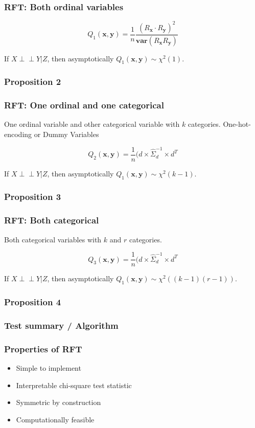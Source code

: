 \documentclass{beamer}
\def\ci{\perp\!\!\!\!\!\perp}
\begin{document}
\begin{frame}
	\frametitle{RFT: Both ordinal variables}
	$$ Q_1(\bm{x}, \bm{y}) = \frac{1}{n} \frac{(R_{\bm{x}} \cdot R_{\bm{y}})^2}{\bm{var}(R_{\bm{x}} R_{\bm{y}})} $$

	If $ X \ci Y | Z $, then asymptotically $ Q_1(\bm{x}, \bm{y}) \sim \chi^2(1) $.
\end{frame}

\begin{frame}
	\frametitle{Proposition 2}
\end{frame}

\begin{frame}
	\frametitle{RFT: One ordinal and one categorical}
	One ordinal variable and other categorical variable with $ k $ categories.
	One-hot-encoding or Dummy Variables


	$$ Q_2(\bm{x}, \bm{y}) = \frac{1}{n} (d \times \hat{\Sigma}_d^{-1} \times d^T $$

	If $ X \ci Y | Z $, then asymptotically $ Q_1(\bm{x}, \bm{y}) \sim \chi^2(k-1) $.
\end{frame}

\begin{frame}
	\frametitle{Proposition 3}
\end{frame}

\begin{frame}
	\frametitle{RFT: Both categorical}
	Both categorical variables with $ k $ and $ r $ categories.


	$$ Q_3(\bm{x}, \bm{y}) = \frac{1}{n} (d \times \hat{\Sigma}_d^{-1} \times d^T $$

	If $ X \ci Y | Z $, then asymptotically $ Q_1(\bm{x}, \bm{y}) \sim
	\chi^2((k-1)(r-1)) $.
\end{frame}

\begin{frame}
	\frametitle{Proposition 4}
\end{frame}

\begin{frame}
	\frametitle{Test summary / Algorithm}

\end{frame}

\begin{frame}
	\frametitle{Properties of RFT}
	\begin{itemize}
		\item Simple to implement
		\item Interpretable chi-square test statistic
		\item Symmetric by construction
		\item Computationally feasible
	\end{itemize}
\end{frame}
\end{document}
